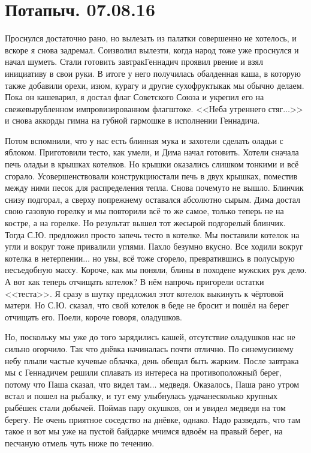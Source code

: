 \chapter{Потапыч. 07.08.16} 

Проснулся достаточно рано, но вылезать из палатки совершенно не хотелось, и вскоре я снова задремал. Соизволил вылезти, когда народ тоже уже проснулся и начал шуметь. Стали готовить завтрак\mdash Геннадич проявил рвение и взял инициативу в свои руки. В итоге у него получилась обалденная каша, в которую также добавили орехи, изюм, курагу и другие сухофрукты\mdash как мы обычно делаем. Пока он кашеварил, я достал флаг Советского Союза и укрепил его на свежевырубленном импровизированном флагштоке. <<Неба утреннего стяг$\ldots$>> и снова аккорды гимна на губной гармошке в исполнении Геннадича. 

Потом вспомнили, что у нас есть блинная мука и захотели сделать оладьи с яблоком. Приготовили тесто, как умели, и Дима начал готовить. Хотели сначала печь оладьи в крышках котелков. Но крышки оказались слишком тонкими и всё сгорало. Усовершенствовали конструкцию\mdash стали печь в двух крышках, поместив между ними песок для распределения тепла. Снова почему\sdash то не вышло. Блинчик снизу подгорал, а сверху по\sdash прежнему оставался абсолютно сырым. Дима достал свою газовую горелку и мы повторили всё то же самое, только теперь не на костре, а на горелке. Но результат вышел тот же\mdash сырой подгорелый блинчик. Тогда С.Ю. предложил просто запечь тесто в котелке. Мы поставили котелок на угли и вокруг тоже привалили углями. Пахло безумно вкусно. Все ходили вокруг котелка в нетерпении$\ldots$ но увы, всё тоже сгорело, превратившись в полусырую несъедобную массу. Короче, как мы поняли, блины в походе\mdash не мужских рук дело. А вот как теперь отчищать котелок? В нём напрочь пригорели остатки <<теста>>. Я сразу в шутку предложил этот котелок выкинуть к чёртовой матери. Но С.Ю. сказал, что свой котелок в беде не бросит и пошёл на берег отчищать его. Поели, короче говоря, оладушков.

Но, поскольку мы уже до того зарядились кашей, отсутствие оладушков нас не сильно огорчило. Так что днёвка начиналась почти отлично. По синему\sdash синему небу плыли частые кучевые облачка, день обещал быть жарким. После завтрака мы с Геннадичем решили сплавать из интереса на противоположный берег, потому что Паша сказал, что видел там$\ldots$ медведя. Оказалось, Паша рано утром встал и пошел на рыбалку, и тут ему улыбнулась удача\mdash несколько крупных рыбёшек стали добычей. Поймав пару окушков, он и увидел медведя на том берегу. Не очень приятное соседство на днёвке, однако. Надо разведать, что там такое и вот мы уже на пустой байдарке мчимся вдвоём на правый берег, на песчаную отмель чуть ниже по течению. 

